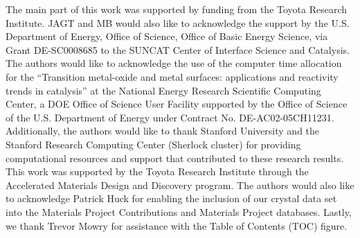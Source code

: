 %


The main part of this work was supported by funding from the Toyota Research Institute. JAGT and MB would also like to acknowledge the support by the U.S. Department of Energy, Office of Science, Office of Basic Energy Science, via Grant DE-SC0008685 to the SUNCAT Center of Interface Science and Catalysis.
%
The authors would like to acknowledge the use of the computer time allocation for the
“Transition metal-oxide and metal surfaces: applications and reactivity trends in catalysis”
at the National Energy Research Scientific Computing Center, a DOE Office of Science User Facility supported by the Office of Science of the U.S. Department of Energy under Contract No. DE-AC02-05CH11231.
%
Additionally, the authors would like to thank Stanford University and the Stanford Research Computing Center (Sherlock cluster) for providing computational resources and support that contributed to these research results.
%
This work was supported by the Toyota Research Institute through the Accelerated Materials Design and Discovery program.
%
The authors would also like to acknowledge Patrick Huck for enabling
the inclusion of our \IrOx crystal data set into the Materials Project Contributions and Materials Project databases.
%
Lastly, we thank Trevor Mowry for assistance with the Table of Contents (TOC) figure.
